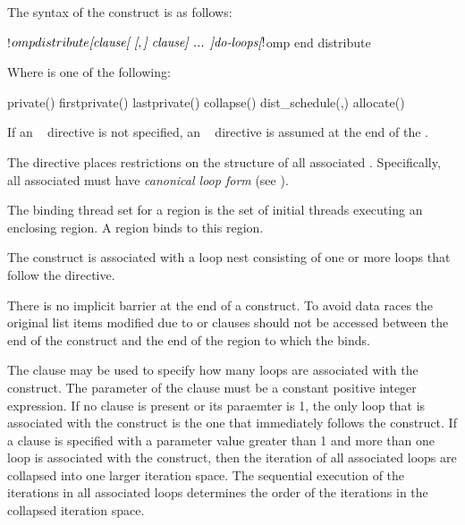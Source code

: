 \begin{fortranspecific}
The syntax of the  construct is as follows:

\begin{ompfPragma}
!$omp distribute \plc{[clause[ [},\plc{] clause] ... ]}
   \plc{do-loops}
\plc{[}!$omp end distribute\plc{]}
\end{ompfPragma}

Where  is one of the following:

\begin{indentedcodelist}
private()
firstprivate()
lastprivate()
collapse()
dist_schedule(\plc{kind[},\plc{ chunk_size]})
allocate(\plc{[allocator: ]})
\end{indentedcodelist}

If an ~ directive is not specified, an ~ directive
is assumed at the end of the .

The  directive places restrictions on the structure of all
associated .  Specifically, all associated  must
have \emph{canonical loop form} (see ).
\end{fortranspecific}

\begin{samepage}

\binding
The binding thread set for a  region is the set of initial
threads executing an enclosing  region. A  region
binds to this  region.

\descr
The  construct is associated with a loop nest consisting of one or more
loops that follow the directive.

There is no implicit barrier at the end of a  construct.
To avoid data races the original
list items modified due to  or  clauses
should not be accessed between the end of the  construct and the end
of the  region to which the  binds.

\end{samepage}

The  clause may be used to specify how many loops are
associated with the  construct.  The parameter of the
 clause must be a constant positive integer expression.
If no  clause is present or its paraemter is 1, the
only loop that is associated with the  construct is
the one that immediately follows the  construct.  If
a  clause is specified with a parameter value greater
than 1 and more than one loop is associated with the 
construct, then the iteration of all associated loops are collapsed
into one larger iteration space.  The sequential execution of the
iterations in all associated loops determines the order of the
iterations in the collapsed iteration space.

